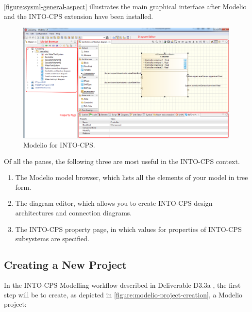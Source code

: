 \autoref{figure:sysml-general-aspect} illustrates the main graphical interface after Modelio and the INTO-CPS extension have been installed.
%
%
\begin{figure}[hpt!]
\centering
\includegraphics[width=\textwidth]{./figures/sysml-general-aspect.png}
\caption{Modelio for INTO-CPS.}
\label{figure:sysml-general-aspect}
\end{figure}
%
%
Of all the panes, the following three are most useful in the INTO-CPS context.
%
%
%
\begin{enumerate}
\item The Modelio model browser, which lists all the elements of your model in tree form.
\item The diagram editor, which allows you to create INTO-CPS design architectures and connection diagrams.
\item The INTO-CPS property page, in which values for properties of INTO-CPS subsystems are specified.
\end{enumerate}
%
%
%
\subsection{Creating a New Project}
In the INTO-CPS Modelling workflow described in Deliverable D3.3a \cite{INTOCPSD3.3a}, the first step will be to create, as depicted in \autoref{figure:modelio-project-creation}, a Modelio project:

